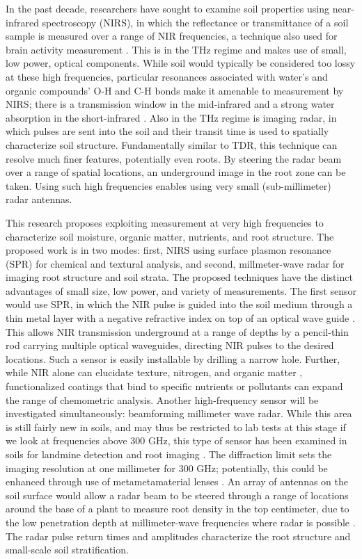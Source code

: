 \documentclass[10pt,letterpaper]{article}
\begin{document}
In the past decade, researchers have sought to examine soil properties using near-infrared spectroscopy (NIRS), in which the reflectance or transmittance of a soil sample is measured over a range of NIR frequencies, a technique also used for brain activity measurement \cite{matsuyama2009design}. This is in the THz regime and makes use of small, low power, optical components. While soil would typically be considered too lossy at these high frequencies, particular resonances associated with water's and organic compounds' O-H and C-H bonds make it amenable to measurement by NIRS; there is a transmission window in the mid-infrared and a strong water absorption in the short-infrared \cite{lewis2017invited, rodionov2014sensing}. Also in the THz regime is imaging radar, in which pulses are sent into the soil and their transit time is used to spatially characterize soil structure. Fundamentally similar to TDR, this technique can resolve much finer features, potentially even roots. By steering the radar beam over a range of spatial locations, an underground image in the root zone can be taken. Using such high frequencies enables using very small (sub-millimeter) radar antennas.

This research proposes exploiting measurement at very high frequencies to characterize soil moisture, organic matter, nutrients, and root structure. The proposed work is in two modes: first, NIRS using surface plasmon resonance (SPR) for chemical and textural analysis, and second, millmeter-wave radar for imaging root structure and soil strata. The proposed techniques have the distinct advantages of small size, low power, and variety of measurements. The first sensor would use SPR, in which the NIR pulse is guided into the soil medium through a thin metal layer with a negative refractive index on top of an optical wave guide \cite{shibayama2016surface}. This allows NIR transmission underground at a range of depths by a pencil-thin rod carrying multiple optical waveguides, directing NIR pulses to the desired locations. Such a sensor is easily installable by drilling a narrow hole. Further, while NIR alone can elucidate texture, nitrogen, and organic matter \cite{chang2001near, sorensen2005determination}, functionalized coatings that bind to specific nutrients or pollutants can expand the range of chemometric analysis. Another high-frequency sensor will be investigated simultaneously: beamforming millimeter wave radar. While this area is still fairly new in soils, and may thus be restricted to lab tests at this stage if we look at frequencies above 300 GHz, this type of sensor has been examined in soils for landmine detection \cite{du2006millimeter} and root imaging \cite{dworak2011application}. The diffraction limit sets the imaging resolution at one millimeter for 300 GHz; potentially, this could be enhanced through use of metametamaterial lenses \cite{zhang2008superlenses}. An array of antennas on the soil surface would allow a radar beam to be steered through a range of locations around the base of a plant to measure root density in the top centimeter, due to the low penetration depth at millimeter-wave frequencies where radar is possible \cite{lewis2017invited}. The radar pulse return times and amplitudes characterize the root structure and small-scale soil stratification.
\end{document}
